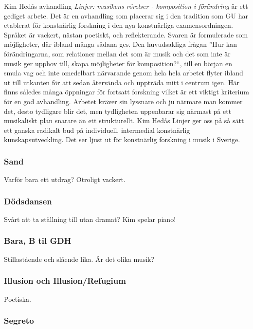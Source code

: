 \documentclass{article}
\begin{document}
Kim Hedås avhandling \emph{Linjer: musikens rörelser - komposition i förändring} är ett gediget arbete. Det är en avhandling som placerar sig i den tradition som GU har etablerat för konstnärlig forskning i den nya konstnärliga examensordningen. Språket är vackert, nästan poetiskt, och reflekterande. Svaren är formulerade som möjligheter, där ibland många sådana ges. Den huvudsakliga frågan ''Hur kan förändringarna, som relationer mellan det som är musik och det som inte är musik ger upphov till, skapa möjligheter för komposition?``, till en början en smula vag och inte omedelbart närvarande genom hela hela arbetet flyter ibland ut till utkanten för att sedan återvända och uppträda mitt i centrum igen. Här finns således många öppningar för fortsatt forskning vilket är ett viktigt kriterium för en god avhandling. Arbetet kräver sin lyssnare och ju närmare man kommer det, desto tydligare blir det, men tydligheten uppenbarar sig närmast på ett musikaliskt plan snarare än ett strukturellt. Kim Hedås Linjer ger oss på så sätt ett ganska radikalt bud på individuell, intermedial konstnärlig kunskapsutveckling. Det ser ljust ut för konstnärlig forskning i musik i Sverige.





\subsubsection{Sand}

Varför bara ett utdrag? Otroligt vackert.


\subsubsection{Dödsdansen}

Svårt att ta ställning till utan dramat? Kim spelar piano!


\subsubsection{Bara, B til GDH}

Stillastående och slående lika. Är det olika musik?


\subsubsection{Illusion och Illusion/Refugium}

Poetiska.


\subsubsection{Segreto}
\end{document}
